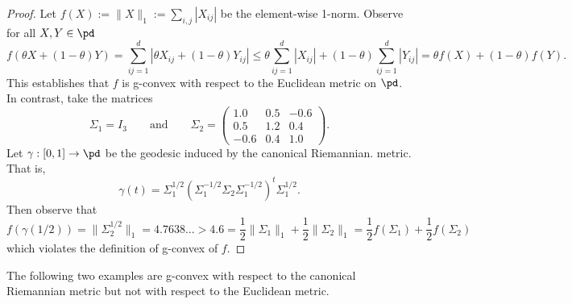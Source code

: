 \documentclass[twoside,11pt]{article}
\begin{document}
\begin{proof}
    Let $f(X) := \|X\|_1 := \sum_{i,j} |X_{ij}|$ be the element-wise 1-norm. Observe for all $X,Y \in \pd$
\[
f\left(\theta X + (1-\theta) Y\right) = \sum_{ij=1}^d\left | \theta X_{ij} + (1-\theta) Y_{ij}\right| \leq \theta \sum_{ij=1}^d |X_{ij}| + (1-\theta)\sum_{ij=1}^d |Y_{ij}| = \theta f(X) + (1-\theta)f(Y) .
\]
This establishes that $f$ is g-convex with respect to the Euclidean metric on $\pd$.
In contrast, take the matrices 
\[
\Sigma_1=I_3 \qquad \text{and} \qquad \Sigma_2=\left(\begin{array}{ccc}
1.0 & 0.5 & -0.6 \\
0.5 & 1.2 & 0.4 \\
-0.6 & 0.4 & 1.0
\end{array}\right).
\]
Let $\gamma:[0,1] \to \pd$ be the geodesic induced by the canonical Riemannian.  metric. That is,
\[
\gamma(t) = \Sigma_1^{1/2}\left(\Sigma_1^{-1/2}\Sigma_2 \Sigma_1^{-1/2}\right)^t \Sigma_1^{1/2}.
\]
Then observe that 
\[
f(\gamma(1/2)) = \|\Sigma_2^{1/2}\|_1 = 4.7638... >  4.6 = \frac{1}{2}\|\Sigma_1\|_1 + \frac{1}{2}\|\Sigma_2\|_1 = \frac{1}{2}f(\Sigma_1) + \frac{1}{2}f(\Sigma_2)
\]
which violates the definition of g-convex of $f$. 
\end{proof}

The following two examples are g-convex with respect to the canonical Riemannian metric but not with respect to the Euclidean metric.
\end{document}
